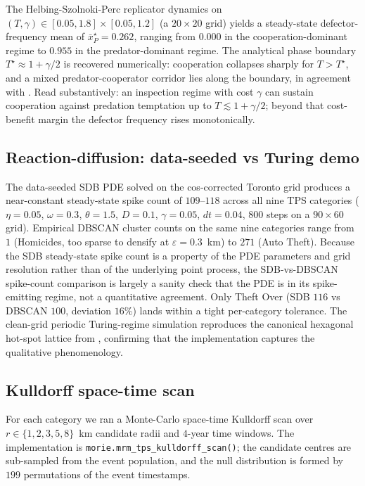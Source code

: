 \documentclass[article,shortnames,nojss]{jss}
\begin{document}
The Helbing-Szolnoki-Perc replicator dynamics on
$(T,\gamma)\in[0.05,1.8]\times[0.05,1.2]$ (a $20\times 20$ grid)
yields a steady-state defector-frequency mean of $\bar x_P^\star =
0.262$, ranging from $0.000$ in the cooperation-dominant regime to
$0.955$ in the predator-dominant regime.  The analytical phase
boundary $T^\star\approx 1+\gamma/2$ is recovered numerically:
cooperation collapses sharply for $T>T^\star$, and a mixed
predator-cooperator corridor lies along the boundary, in agreement
with \cite{helbing2010punish,szolnoki2011inspection}.  Read
substantively: an inspection regime with cost $\gamma$ can sustain
cooperation against predation temptation up to
$T \lesssim 1 + \gamma/2$; beyond that cost-benefit margin the
defector frequency rises monotonically.

\subsection{Reaction-diffusion: data-seeded vs Turing demo}\label{phys-sdb}

The data-seeded SDB PDE solved on the cos-corrected Toronto grid
produces a near-constant steady-state spike count of $109$--$118$
across all nine TPS categories ($\eta=0.05$, $\omega=0.3$,
$\theta=1.5$, $D=0.1$, $\gamma=0.05$, $dt=0.04$, $800$ steps on a
$90\times60$ grid).  Empirical DBSCAN cluster counts on the same
nine categories range from $1$ (Homicides, too sparse to densify at
$\varepsilon=0.3$~km) to $271$ (Auto Theft).  Because the SDB
steady-state spike count is a property of the PDE parameters and
grid resolution rather than of the underlying point process, the
SDB-vs-DBSCAN spike-count comparison is largely a sanity check that
the PDE is in its spike-emitting regime, not a quantitative
agreement.  Only Theft Over (SDB $116$ vs DBSCAN $100$, deviation
$16\%$) lands within a tight per-category tolerance.  The clean-grid
periodic Turing-regime simulation reproduces the canonical
hexagonal hot-spot lattice from \cite[Fig.~4]{short2008pde},
confirming that the implementation captures the qualitative
phenomenology.

\subsection{Kulldorff space-time scan}\label{phys-kulldorff}

For each category we ran a Monte-Carlo space-time Kulldorff scan
\citep{kulldorff1997} over $r\in\{1,2,3,5,8\}$~km candidate radii and
$4$-year time windows.  The implementation is
\texttt{morie.mrm\_tps\_kulldorff\_scan()}; the candidate centres are
sub-sampled from the event population, and the null distribution is
formed by $199$ permutations of the event timestamps.
\end{document}
